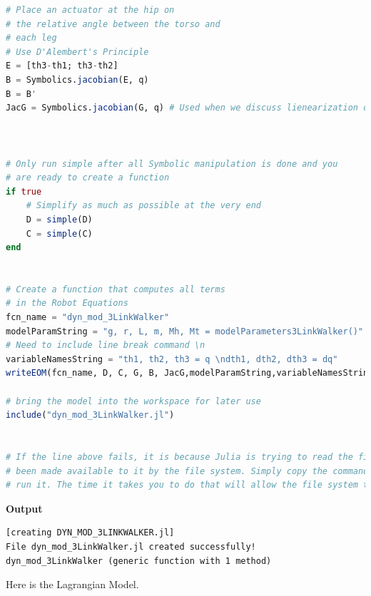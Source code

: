 \begin{lstlisting}[language=Julia,style=mystyle]
# Place an actuator at the hip on 
# the relative angle between the torso and 
# each leg
# Use D'Alembert's Principle 
E = [th3-th1; th3-th2] 
B = Symbolics.jacobian(E, q)
B = B'
JacG = Symbolics.jacobian(G, q) # Used when we discuss lienearization of NL models



# Only run simple after all Symbolic manipulation is done and you 
# are ready to create a function
if true
    # Simplify as much as possible at the very end
    D = simple(D)
    C = simple(C)
end


# Create a function that computes all terms
# in the Robot Equations
fcn_name = "dyn_mod_3LinkWalker"
modelParamString = "g, r, L, m, Mh, Mt = modelParameters3LinkWalker()"
# Need to include line break command \n
variableNamesString = "th1, th2, th3 = q \ndth1, dth2, dth3 = dq"
writeEOM(fcn_name, D, C, G, B, JacG,modelParamString,variableNamesString)

# bring the model into the workspace for later use
include("dyn_mod_3LinkWalker.jl") 


# If the line above fails, it is because Julia is trying to read the file before it has 
# been made available to it by the file system. Simply copy the command into a new cell and 
# run it. The time it takes you to do that will allow the file system to catch up! :-)
\end{lstlisting}
\textbf{Output} 
\begin{verbatim}
[creating DYN_MOD_3LINKWALKER.jl]
File dyn_mod_3LinkWalker.jl created successfully!
dyn_mod_3LinkWalker (generic function with 1 method)
\end{verbatim}

\bigskip

Here is the Lagrangian Model.

\bigskip

